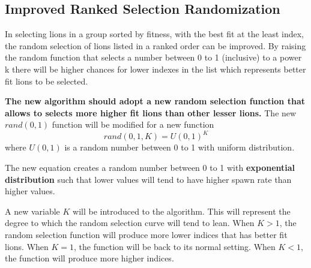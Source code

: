 \subsection{Improved Ranked Selection Randomization}

\par In selecting lions in a group sorted by fitness, with the best fit at the least index, the random selection of lions listed in a ranked order can be improved. By raising the random function that selects a number between 0 to 1 (inclusive) to a power k there will be higher chances for lower indexes in the list which represents better fit lions to be selected.

\par \textbf{The new algorithm should adopt a new random selection function that allows to selects more higher fit lions than other lesser lions.} The new $rand(0,1)$ function will be modified for a new function
$$
rand(0,1,K) = U(0,1)^K
$$
where $U(0,1)$ is a random number between 0 to 1 with uniform distribution.

\par The new equation creates a random number between 0 to 1 with \textbf{exponential distribution} such that lower values will tend to have higher spawn rate than higher values.

\par A new variable $K$ will be introduced to the algorithm. This will represent the degree to which the random selection curve will tend to lean. When $K > 1$, the random selection function will produce more lower indices that has better fit lions. When $K = 1$, the function will be back to its normal setting. When $K < 1$, the function will produce more higher indices.
